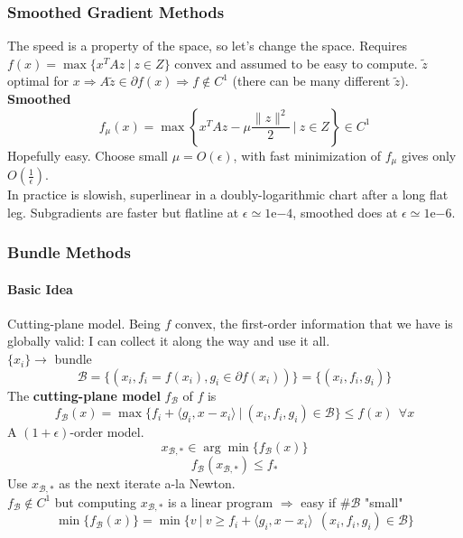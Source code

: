 \documentclass[10pt]{report}
\begin{document}
\subsubsection{Smoothed Gradient Methods} The speed is a property of the space, so let's change the space. Requires $f(x) = \max\{x^TAz\:|\:z\in Z\}$ convex and assumed to be easy to compute. $\tilde{z}$ optimal for $x\Rightarrow A\tilde{z}\in\partial f(x)\Rightarrow f\not\in C^1$ (there can be many different $\tilde{z}$).\\
\textbf{Smoothed} $$f_\mu(x)=\max\left\{x^TAz-\mu\frac{\|z\|^2}{2}\:|\:z\in Z\right\}\in C^1$$ Hopefully easy. Choose small $\mu=O(\epsilon)$, with fast minimization of $f_\mu$ gives only $O(\frac{1}{\epsilon})$.\\
In practice is slowish, superlinear in a doubly-logarithmic chart after a long flat leg. Subgradients are faster but flatline at $\epsilon\simeq 1$e$-4$, smoothed does at $\epsilon\simeq 1$e$-6$.
\subsubsection{Bundle Methods}
\paragraph{Basic Idea} Cutting-plane model. Being $f$ convex, the first-order information that we have is globally valid: I can collect it along the way and use it all.\\
$\{x_i\}\rightarrow$ bundle $$\mathscr{B}=\{(x_i, f_i = f(x_i), g_i\in\partial f(x_i))\} = \{(x_i, f_i, g_i)\}$$
The \textbf{cutting-plane model} $f_\mathscr{B}$ of $f$ is $$f_\mathscr{B}(x) = \max\{f_i+\langle g_i, x-x_i\rangle\:|\:(x_i, f_i, g_i)\in \mathscr{B}\}\leq f(x)\:\:\forall x$$ A $(1+\epsilon)$-order model.
$$x_{\mathscr{B},*}\in \arg\min\{f_\mathscr{B}(x)\}$$ $$f_\mathscr{B}(x_{\mathscr{B},*})\leq f_*$$ Use $x_{\mathscr{B},*}$ as the next iterate a-la Newton.\\
$f_\mathscr{B}\not\in C^1$ but computing $x_{\mathscr{B},*}$ is a linear program $\Rightarrow$ easy if $\# \mathscr{B}$ "small" $$\min\{f_\mathscr{B}(x)\}=\min\{v\:|\:v\geq f_i+\langle g_i, x-x_i\rangle\:\:(x_i, f_i, g_i)\in \mathscr{B}\}$$
\end{document}
